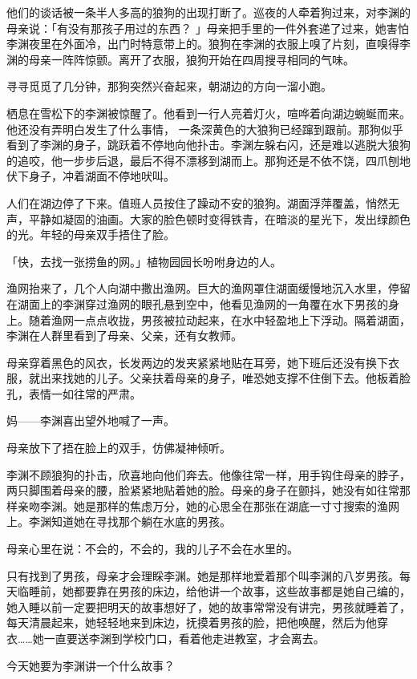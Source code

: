 \documentclass[UTF8]{ctexart}
\begin{document}
他们的谈话被一条半人多高的狼狗的出现打断了。巡夜的人牵着狗过来，对李渊的母亲说：「有没有那孩子用过的东西？
」母亲把手里的一件外套递了过来，她害怕李渊夜里在外面冷，出门时特意带上的。狼狗在李渊的衣服上嗅了片刻，直嗅得李渊的母亲一阵阵惊颤。离开了衣服，狼狗开始在四周搜寻相同的气味。

寻寻觅觅了几分钟，那狗突然兴奋起来，朝湖边的方向一溜小跑。

栖息在雪松下的李渊被惊醒了。他看到一行人亮着灯火，喧哗着向湖边蜿蜒而来。他还没有弄明白发生了什么事情，
一条深黄色的大狼狗已经蹿到跟前。那狗似乎看到了李渊的身子，跳跃着不停地向他扑击。李渊左躲右闪，还是难以逃脱大狼狗的追咬，他一步步后退，最后不得不漂移到湖而上。那狗还是不依不饶，四爪刨地伏下身子，冲着湖面不停地吠叫。

人们在湖边停了下来。值班人员按住了躁动不安的狼狗。湖面浮萍覆盖，悄然无声，平静如凝固的油画。大家的脸色顿时变得铁青，在暗淡的星光下，发出绿颜色的光。年轻的母亲双手捂住了脸。

「快，去找一张捞鱼的网。」植物园园长吩咐身边的人。

渔网抬来了，几个人向湖中撒出渔网。巨大的渔网罩住湖面缓慢地沉入水里，停留在湖面上的李渊穿过渔网的眼孔悬到空中，他看见渔网的一角覆在水下男孩的身上。随着渔网一点点收拢，男孩被拉动起来，在水中轻盈地上下浮动。隔着湖面，李渊在人群里看到了母亲、父亲，还有女教师。

母亲穿着黑色的风衣，长发两边的发夹紧紧地贴在耳旁，她下班后还没有换下衣服，就出来找她的儿子。父亲扶着母亲的身子，唯恐她支撑不住倒下去。他板着脸孔，表情一如往常的严肃。

妈------李渊喜出望外地喊了一声。

母亲放下了捂在脸上的双手，仿佛凝神倾听。

李渊不顾狼狗的扑击，欣喜地向他们奔去。他像往常一样，用手钩住母亲的脖子，两只脚围着母亲的腰，脸紧紧地贴着她的脸。母亲的身子在颤抖，她没有如往常那样亲吻李渊。她是那样的焦虑万分，她的心思全在那张在湖底一寸寸搜索的渔网上。李渊知道她在寻找那个躺在水底的男孩。

母亲心里在说：不会的，不会的，我的儿子不会在水里的。

只有找到了男孩，母亲才会理睬李渊。她是那样地爱着那个叫李渊的八岁男孩。每天临睡前，她都要靠在男孩的床边，给他讲一个故事，这些故事都是她自己编的，她入睡以前一定要把明天的故事想好了，她的故事常常没有讲完，男孩就睡着了，每天清晨起来，她轻轻地来到床边，抚摸着男孩的脸，把他唤醒，然后为他穿衣\ldots\ldots 她一直要送李渊到学校门口，看着他走进教室，才会离去。

今天她要为李渊讲一个什么故事？
\end{document}

